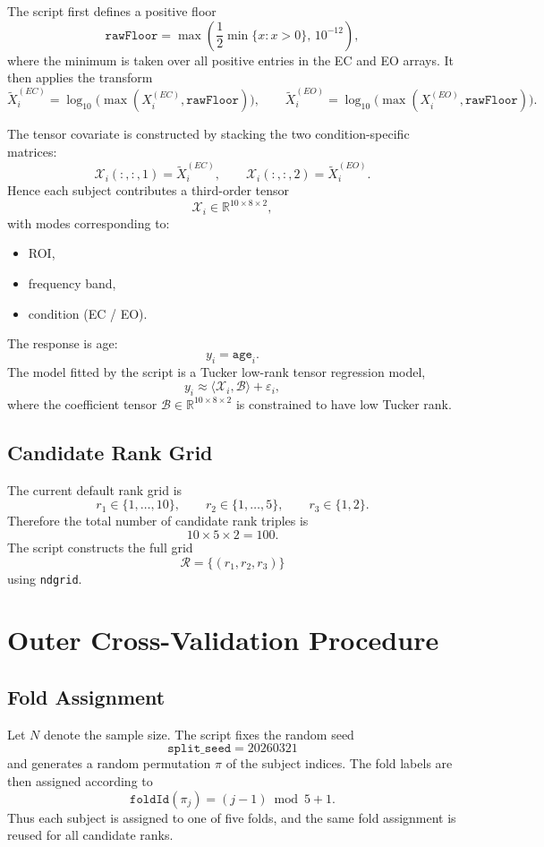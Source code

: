 \documentclass[11pt]{article}
\begin{document}
The script first defines a positive floor
\[
\texttt{rawFloor}
=
\max\left(\frac{1}{2}\min\{x:x>0\},\,10^{-12}\right),
\]
where the minimum is taken over all positive entries in the EC and EO arrays.
It then applies the transform
\[
\widetilde X_i^{(EC)}=\log_{10}\!\bigl(\max(X_i^{(EC)},\texttt{rawFloor})\bigr),\qquad
\widetilde X_i^{(EO)}=\log_{10}\!\bigl(\max(X_i^{(EO)},\texttt{rawFloor})\bigr).
\]

The tensor covariate is constructed by stacking the two condition-specific matrices:
\[
\mathcal X_i(:,:,1)=\widetilde X_i^{(EC)},\qquad
\mathcal X_i(:,:,2)=\widetilde X_i^{(EO)}.
\]
Hence each subject contributes a third-order tensor
\[
\mathcal X_i \in \mathbb{R}^{10\times 8\times 2},
\]
with modes corresponding to:
\begin{itemize}[leftmargin=2em]
\item ROI,
\item frequency band,
\item condition (EC / EO).
\end{itemize}

The response is age:
\[
y_i = \texttt{age}_i.
\]
The model fitted by the script is a Tucker low-rank tensor regression model,
\[
y_i \approx \langle \mathcal X_i,\mathcal B\rangle + \varepsilon_i,
\]
where the coefficient tensor $\mathcal B\in\mathbb{R}^{10\times 8\times 2}$ is constrained to have low Tucker rank.

\subsection{Candidate Rank Grid}
The current default rank grid is
\[
r_1\in\{1,\dots,10\},\qquad
r_2\in\{1,\dots,5\},\qquad
r_3\in\{1,2\}.
\]
Therefore the total number of candidate rank triples is
\[
10\times 5\times 2 = 100.
\]
The script constructs the full grid
\[
\mathcal R=\{(r_1,r_2,r_3)\}
\]
using \texttt{ndgrid}.

\section{Outer Cross-Validation Procedure}
\subsection{Fold Assignment}
Let $N$ denote the sample size. The script fixes the random seed
\[
\texttt{split\_seed}=20260321
\]
and generates a random permutation $\pi$ of the subject indices. The fold labels are then assigned according to
\[
\texttt{foldId}(\pi_j)=(j-1)\bmod 5 + 1.
\]
Thus each subject is assigned to one of five folds, and the same fold assignment is reused for all candidate ranks.
\end{document}

